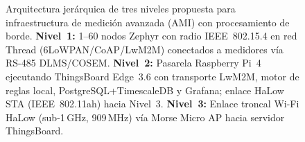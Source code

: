 \begin{figure}[H]
{%
}%

\caption[Arquitectura jerárquica de tres niveles]{%
Arquitectura jerárquica de tres niveles propuesta para infraestructura
de medición avanzada (AMI) con procesamiento de borde.
\textbf{Nivel~1:} 1--60 nodos Zephyr con radio IEEE~802.15.4 en red
Thread (6LoWPAN/CoAP/LwM2M) conectados a medidores vía RS-485
DLMS/COSEM.
\textbf{Nivel~2:} Pasarela Raspberry Pi~4 ejecutando ThingsBoard
Edge~3.6 con transporte LwM2M, motor de reglas local,
PostgreSQL+TimescaleDB y Grafana; enlace HaLow STA (IEEE~802.11ah)
hacia Nivel~3.
\textbf{Nivel~3:} Enlace troncal Wi-Fi HaLow (sub-1\,GHz, 909\,MHz)
vía Morse Micro AP hacia servidor ThingsBoard.}
\label{fig:arquitectura-tres-niveles}
\end{figure}
